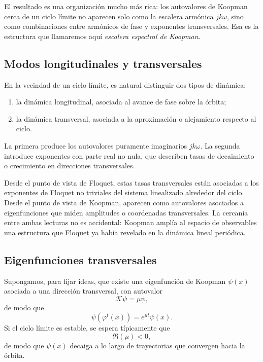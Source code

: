 El resultado es una organización mucho más rica: los autovalores de Koopman cerca de un ciclo límite no aparecen solo como la escalera armónica \(jk\omega\), sino como combinaciones entre armónicos de fase y exponentes transversales. Esa es la estructura que llamaremos aquí \emph{escalera espectral de Koopman}.

\subsection{Modos longitudinales y transversales}

En la vecindad de un ciclo límite, es natural distinguir dos tipos de dinámica:
\begin{enumerate}
\item la dinámica longitudinal, asociada al avance de fase sobre la órbita;
\item la dinámica transversal, asociada a la aproximación o alejamiento respecto al ciclo.
\end{enumerate}

La primera produce los autovalores puramente imaginarios \(jk\omega\). La segunda introduce exponentes con parte real no nula, que describen tasas de decaimiento o crecimiento en direcciones transversales.

Desde el punto de vista de Floquet, estas tasas transversales están asociadas a los exponentes de Floquet no triviales del sistema linealizado alrededor del ciclo. Desde el punto de vista de Koopman, aparecen como autovalores asociados a eigenfunciones que miden amplitudes o coordenadas transversales. La cercanía entre ambas lecturas no es accidental: Koopman amplía al espacio de observables una estructura que Floquet ya había revelado en la dinámica lineal periódica.

\subsection{Eigenfunciones transversales}

Supongamos, para fijar ideas, que existe una eigenfunción de Koopman \(\psi(x)\) asociada a una dirección transversal, con autovalor
\begin{equation}
\mathcal{K}\psi=\mu\psi,
\label{eq:Koopman_ladder_transverse_eigenfunction}
\end{equation}
de modo que
\begin{equation}
\psi(\varphi^t(x))=e^{\mu t}\psi(x).
\label{eq:Koopman_ladder_transverse_evolution}
\end{equation}
Si el ciclo límite es estable, se espera típicamente que
\[
\Re(\mu)<0,
\]
de modo que \(\psi(x)\) decaiga a lo largo de trayectorias que convergen hacia la órbita.

